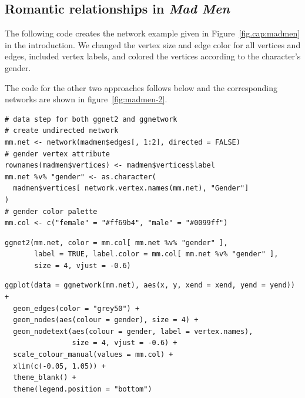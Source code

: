 \subsection{Romantic relationships in \emph{Mad Men}} %

  The following code creates the network example given in Figure~\ref{fig.cap:madmen} in the introduction. We changed the vertex size and edge color for all vertices and edges, included vertex labels, and colored the vertices according to the character's gender.

The code for the other two approaches follows below and the corresponding networks are shown in figure~\ref{fig:madmen-2}.

\begin{knitrout}
\color{fgcolor}\begin{kframe}
\begin{verbatim}
# data step for both ggnet2 and ggnetwork
# create undirected network
mm.net <- network(madmen$edges[, 1:2], directed = FALSE)
# gender vertex attribute
rownames(madmen$vertices) <- madmen$vertices$label
mm.net %v% "gender" <- as.character(
  madmen$vertices[ network.vertex.names(mm.net), "Gender"]
)
# gender color palette
mm.col <- c("female" = "#ff69b4", "male" = "#0099ff")
\end{verbatim}
\end{kframe}
\end{knitrout}

\begin{knitrout}
\color{fgcolor}\begin{kframe}
\begin{verbatim}
ggnet2(mm.net, color = mm.col[ mm.net %v% "gender" ],
       label = TRUE, label.color = mm.col[ mm.net %v% "gender" ],
       size = 4, vjust = -0.6)
\end{verbatim}
\end{kframe}
\end{knitrout}

\begin{knitrout}
\color{fgcolor}\begin{kframe}
\begin{verbatim}
ggplot(data = ggnetwork(mm.net), aes(x, y, xend = xend, yend = yend)) +
  geom_edges(color = "grey50") +
  geom_nodes(aes(colour = gender), size = 4) +
  geom_nodetext(aes(colour = gender, label = vertex.names),
                size = 4, vjust = -0.6) +
  scale_colour_manual(values = mm.col) +
  xlim(c(-0.05, 1.05)) +
  theme_blank() +
  theme(legend.position = "bottom")
\end{verbatim}
\end{kframe}
\end{knitrout}

